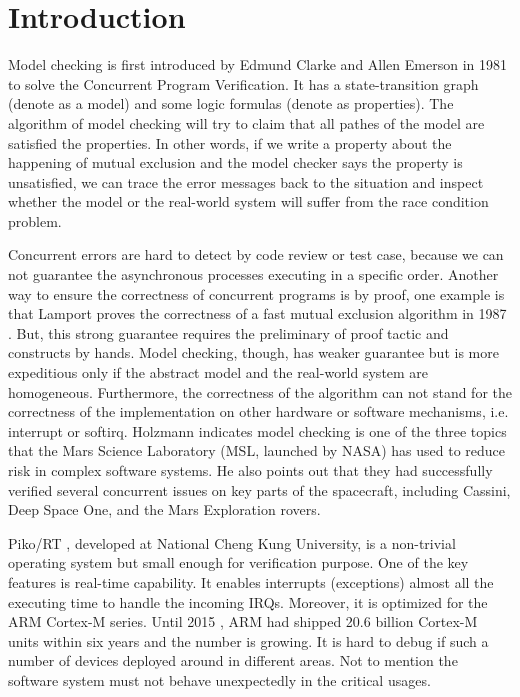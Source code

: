 \section{Introduction}
Model checking \cite{Clark:2000, Clarke:2008:BMC:1423535.1423536} is first introduced by Edmund Clarke and Allen Emerson in 1981 to solve the Concurrent Program Verification. It has a state-transition graph (denote as a model) and some logic formulas (denote as properties). The algorithm of model checking will try to claim that all pathes of the model are satisfied the properties. In other words, if we write a property about the happening of mutual exclusion and the model checker says the property is unsatisfied, we can trace the error messages back to the situation and inspect whether the model or the real-world system will suffer from the race condition problem.

Concurrent errors are hard to detect by code review or test case, because we can not guarantee the asynchronous processes executing in a specific order. Another way to ensure the correctness of concurrent programs is by proof, one example is that Lamport proves the correctness of a fast mutual exclusion algorithm in 1987 \cite{Lamport:1987:FME:7351.7352}. But, this strong guarantee requires the preliminary of proof tactic and constructs by hands. Model checking, though, has weaker guarantee but is more expeditious only if the abstract model and the real-world system are homogeneous. Furthermore, the correctness of the algorithm can not stand for the correctness of the implementation on other hardware or software mechanisms, i.e. interrupt or softirq. Holzmann \cite{Holzmann:2014:MC:2556647.2560218} indicates model checking is one of the three topics that the Mars Science Laboratory (MSL, launched by NASA) has used to reduce risk in complex software systems. He also points out that they had successfully verified several concurrent issues on key parts of the spacecraft, including Cassini, Deep Space One, and the Mars Exploration rovers.

Piko/RT \cite{PikoRT}, developed at National Cheng Kung University, is a non-trivial operating system but small enough for verification purpose. One of the key features is real-time capability. It enables interrupts (exceptions) almost all the executing time to handle the incoming IRQs. Moreover, it is optimized for the ARM Cortex-M series. Until 2015 \cite{ARMProduct}, ARM had shipped 20.6 billion Cortex-M units within six years and the number is growing. It is hard to debug if such a number of devices deployed around in different areas. Not to mention the software system must not behave unexpectedly in the critical usages.

